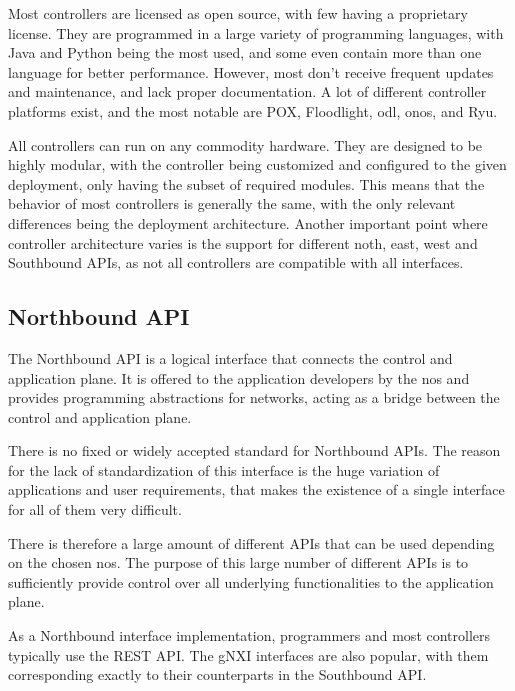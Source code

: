 Most controllers are licensed as open source, with few having a proprietary license. They are programmed in a large variety of programming languages, with Java and Python being the most used, and some even contain more than one language for better performance. However, most don't receive frequent updates and maintenance, and lack proper documentation\cite{zhu_sdn_2020}. A lot of different controller platforms exist, and the most notable are POX, Floodlight, \gls{odl}, \gls{onos}, and Ryu. 

All controllers can run on any commodity hardware\cite{kreutz_software-defined_2015}. They are designed to be highly modular, with the controller being customized and configured to the given deployment, only having the subset of required modules\cite{peterson_software-defined_2021}. This means that the behavior of most controllers is generally the same, with the only relevant differences being the deployment architecture. Another important point where controller architecture varies is the support for different noth, east, west and Southbound APIs, as not all controllers are compatible with all interfaces. 

\subsection{Northbound API} %
The Northbound API is a logical interface that connects the control and application plane. It is offered to the application developers by the \gls{nos}\cite{kreutz_software-defined_2015} and provides programming abstractions for networks, acting as a bridge between the control and application plane\cite{latif_comprehensive_2020}.

There is no fixed or widely accepted standard for Northbound APIs\cite{kreutz_software-defined_2015}\cite{latif_comprehensive_2020}. The reason for the lack of standardization of this interface is the huge variation of applications and user requirements, that makes the existence of a single interface for all of them very difficult.

There is therefore a large amount of different APIs that can be used depending on the chosen \gls{nos}. The purpose of this large number of different APIs is to sufficiently provide control over all underlying functionalities to the application plane\cite{peterson_software-defined_2021}.

As a Northbound interface implementation, programmers and most controllers typically use the REST API\cite{latif_comprehensive_2020}. The gNXI interfaces are also popular, with them corresponding exactly to their counterparts in the Southbound API\cite{peterson_software-defined_2021}. 
        

